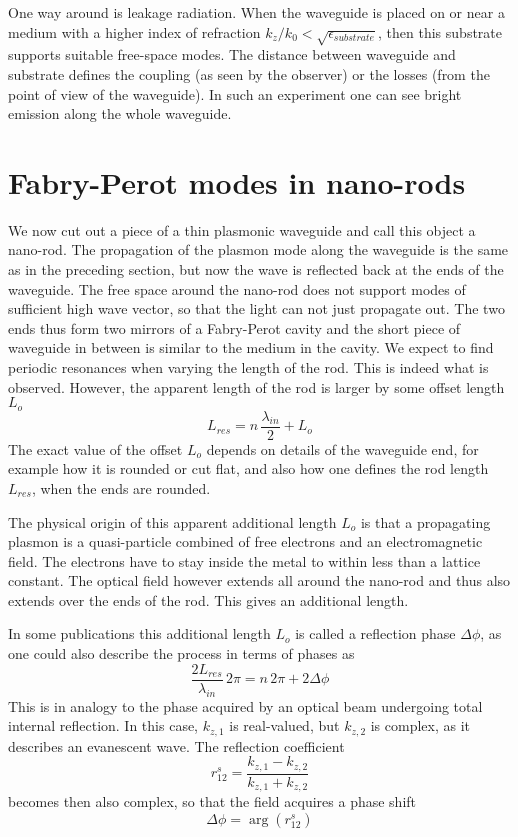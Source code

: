 One way around is leakage radiation. When the waveguide is placed on or near a medium with a higher index of refraction $k_z / k_0 < \sqrt{\epsilon_{substrate}}$, then this substrate supports suitable free-space modes. The distance between waveguide and substrate defines the coupling (as seen by the observer) or the losses (from the point of view of the waveguide). In such an experiment one can see bright emission along the whole waveguide.



\section{Fabry-Perot modes in nano-rods}

We now cut out a piece of  a thin plasmonic waveguide and call this object a nano-rod. The propagation of the plasmon mode along the waveguide is the same as in the preceding section, but now the wave is reflected back at the ends of the waveguide. The free space around the nano-rod does not support modes of sufficient high wave vector, so that the light can not just propagate out. The two ends thus form two mirrors of a Fabry-Perot cavity and the short piece of waveguide in between is similar to the medium in the cavity. We expect to find periodic resonances when varying the length of the rod. This is indeed what is observed. However, the apparent length of the rod is larger by some offset length $L_o$
\begin{equation}
  L_{res} = n \, \frac{\lambda_{in}}{2} + L_{o}
\end{equation}
The exact value of the offset  $L_o$ depends on details of the waveguide end, for example how it is rounded or cut flat, and also how one defines the rod length $L_{res}$, when the ends are rounded.

The physical origin of this apparent additional length  $L_o$ is that a propagating plasmon is a quasi-particle combined of free electrons and an electromagnetic field. The electrons have to stay inside the metal to within less than a lattice constant. The optical field however extends all around the nano-rod and thus also extends over the ends of the rod. This gives an additional length.

In some publications this additional length $L_o$ is called a reflection phase $\Delta \phi$, as one could also describe the process in terms of phases as
\begin{equation}
  \frac{2 L_{res}}{\lambda_{in}} \, 2 \pi = n \, 2 \pi + 2 \Delta \phi
\end{equation}
This is in analogy to the phase acquired by an optical beam undergoing total internal reflection. In this case, $k_{z,1}$ is real-valued, but $k_{z,2}$ is complex, as it describes an evanescent wave. The reflection coefficient 
\begin{equation}
  r_{12}^s =  \frac{k_{z,1} - k_{z,2}}{k_{z,1} + k_{z,2}}  
\end{equation}
becomes then also complex, so that the field acquires a phase shift 
\begin{equation}
  \Delta \phi = \arg (r_{12}^s)
\end{equation}

